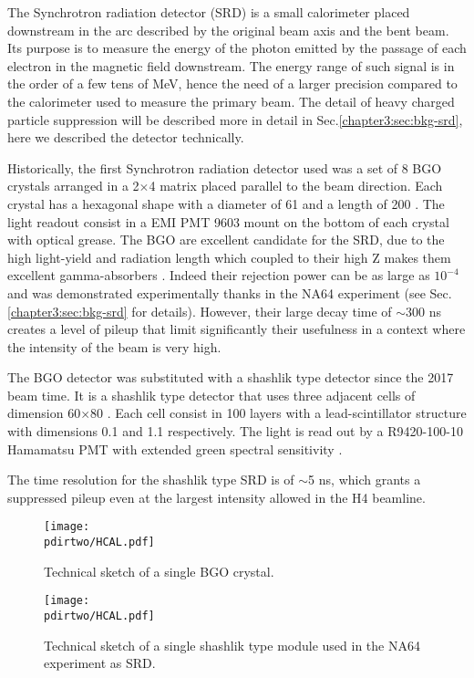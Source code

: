 The Synchrotron radiation detector (SRD) is a small calorimeter placed downstream in the arc described by the original beam axis and the bent beam. Its purpose is to measure the energy of the photon emitted by the passage of each electron in the magnetic field downstream. The energy range of such signal is in the order of a few tens of MeV, hence the need of a larger precision compared to the calorimeter used to measure the primary beam. The detail of heavy charged particle suppression will be described more in detail in Sec.\ref{chapter3:sec:bkg-srd}, here we described the detector technically.

Historically, the first Synchrotron radiation detector used was a set of 8 BGO crystals arranged in a 2$\times$4 matrix placed parallel to the beam direction. Each crystal has a hexagonal shape with a diameter of 61 \mmi and a length of 200 \mmi. The light readout consist in a EMI PMT 9603 mount on the bottom of each crystal with optical grease. The BGO are excellent candidate for the SRD, due to the high light-yield and radiation length which coupled to their high Z makes them excellent gamma-absorbers \cite{bgo-crystal}. Indeed their rejection power can be as large as $10^{-4}$ and was demonstrated experimentally thanks in the NA64 experiment (see Sec.\ref{chapter3:sec:bkg-srd} for details). However, their large decay time of $\sim$300 \si{ns} creates a level of pileup that limit significantly their usefulness in a context where the intensity of the beam is very high.

The BGO detector was substituted with a shashlik type detector since the 2017 beam time. It is a shashlik type detector that uses three adjacent cells of dimension 60$\times$80 \mmi. Each cell consist in 100 layers with a lead-scintillator structure with dimensions 0.1 \mmi and 1.1 \mmi respectively. The light is read out by a R9420-100-10 Hamamatsu PMT with extended green spectral sensitivity \cite{hamamatsu-R9420-100-10}.

The time resolution for the shashlik type SRD is of $\sim$5 \si{ns}, which grants a suppressed pileup even at the largest intensity allowed in the H4 beamline.

\begin{figure}[bth!]
  \centering
  \texttt{[image: \\pdirtwo/HCAL.pdf]}
  \caption[BGO sketch]{Technical sketch of a single BGO crystal.}
  \label{fig:bgo-sketch}
\end{figure}

\begin{figure}[bth!]
  \centering
  \texttt{[image: \\pdirtwo/HCAL.pdf]}
  \caption[SRD sketch]{Technical sketch of a single shashlik type module used in the NA64 experiment as SRD.}
  \label{fig:srd-sketch}
\end{figure}

